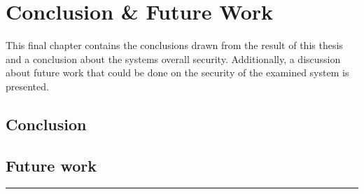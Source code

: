 \chapter{Conclusion \& Future Work} \label{ch:conclusion}
This final chapter contains the conclusions drawn from the result of this thesis and a conclusion about the systems overall security. Additionally, a discussion about future work that could be done on the security of the examined system is presented.

\section{Conclusion}
\todo

\section{Future work} \label{ch:conclusion:related-work}
\todo

\noindent\rule{\textwidth}{0.4mm}
